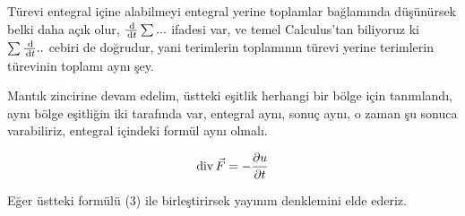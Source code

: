 \documentclass[12pt,fleqn]{article}\usepackage{../../common}
\begin{document}
Türevi entegral içine alabilmeyi entegral yerine toplamlar bağlamında düşünürsek
belki daha açık olur, $\frac{\,\mathrm{d}}{\,\mathrm{d} t} \sum ...$ ifadesi var, ve temel
Calculus'tan biliyoruz ki $\sum \frac{\,\mathrm{d}}{\,\mathrm{d} t} ..$ cebiri de doğrudur,
yani terimlerin toplamının türevi yerine terimlerin türevinin toplamı aynı şey.

Mantık zincirine devam edelim, üstteki eşitlik herhangi bir bölge için
tanımlandı, aynı bölge eşitliğin iki tarafında var, entegral aynı, sonuç
aynı, o zaman şu sonuca varabiliriz, entegral içindeki formül aynı olmalı.

$$
\operatorname{div} \vec{F}  = - \frac{\partial u}{\partial t}
$$

Eğer üstteki formülü (3) ile birleştirirsek yayınım denklemini elde ederiz.
\end{document}

